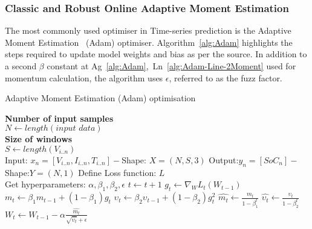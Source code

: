 %
\subsubsection{Classic and Robust Online Adaptive Moment Estimation}
The most commonly used optimiser in Time-series prediction is the Adaptive Moment Estimation~\cite{kingma_adam_2017} (Adam) optimiser.
\mbox{Algorithm~\ref{alg:Adam}} highlights the steps required to update model weights and bias as per the source.
In addition to a second $\beta$ constant at \mbox{Ag~\ref{alg:Adam}, Ln~\ref{alg:Adam-Line-2Moment}} used for momentum calculation, the algorithm uses $\epsilon$, referred to as the fuzz factor.
\begin{algorithm}
  \caption{Adaptive Moment Estimation (Adam) optimisation}
  \begin{algorithmic}[1]
    \STATE \textbf{Number of input samples} \\ $N\gets length(\textit{input data})$\\
    \STATE \textbf{Size of windows} \\ $S\gets length(V_{i..n})$\\
    \STATE Input: $x_n = [V_{i..n}, I_{i..n}, T_{i..n}] - $Shape: $X = (N, S, 3)$
    \STATE Output:$y_n = [SoC_{n}] - $Shape:$Y = (N, 1)$
    \STATE Define Loss function: $L$ \\
           Get hyperparameters: $\alpha, \beta_1, \beta_2, \epsilon$
    \STATE $t \gets t+1$
    \STATE $g_t \gets \nabla_W L_t (W_{t-1})$ 
    \STATE $m_t \gets \beta_1 m_{t-1}+(1-\beta_1) g_t $ 
    \STATE $\upsilon_t \gets \beta_2 \upsilon_{t-1}+ \left(1-\beta_2 \right)g^2_t $ 
    \STATE $\hat{m_t} \gets \frac{m_t}{1-\beta^t_1}$ 
    \STATE $\hat{\upsilon_t} \gets \frac{\upsilon_t}{1-\beta^t_2} $ 
    \STATE $W_t \gets W_{t-1}- \alpha \frac{\hat{m_t}}{\sqrt{\hat{\upsilon_t}}+\epsilon} $ 
    \ENDWHILE
  \end{algorithmic}
  \label{alg:Adam}
\end{algorithm}

